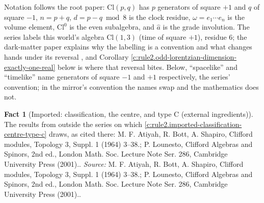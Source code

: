 \documentclass[11pt]{article}
\theoremstyle{definition}
\newtheorem{fact}[theorem]{Fact}
\theoremstyle{plain}
\providecommand{\Cl}{}\renewcommand{\Cl}{\mathrm{Cl}}
\begin{document}
Notation follows the root paper: $\Cl(p,q)$ has $p$ generators of square $+1$ and $q$ of square $-1$, $n = p + q$, $d = p - q \bmod 8$ is the clock residue, $\omega = e_1 \cdots e_n$ is the volume element, $\Cl^0$ is the even subalgebra, and $\hat{a}$ is the grade involution. The series labels this world's algebra $\Cl(1,3)$ (time of square $+1$), residue $6$; the dark-matter paper explains why the labelling is a convention and what changes hands under its reversal \cite{ButlerT14}, and Corollary \ref{c:rule2.odd-lorentzian-dimension-exactly-one-real} below is where that reversal bites. Below, ``spacelike'' and ``timelike'' name generators of square $-1$ and $+1$ respectively, the series' convention; in the mirror's convention the names swap and the mathematics does not.

\begin{fact}[Imported: classification, the centre, and type C (external ingredients)]\label{c:rule2.imported-classification-centre-type-c-external}
The results from outside the series on which \ref{c:rule2.imported-classification-centre-type-c} draws, as cited there: M. F. Atiyah, R. Bott, A. Shapiro, Clifford modules, Topology 3, Suppl. 1 (1964) 3--38.; P. Lounesto, Clifford Algebras and Spinors, 2nd ed., London Math. Soc. Lecture Note Ser. 286, Cambridge University Press (2001)..
\emph{Source:} M. F. Atiyah, R. Bott, A. Shapiro, Clifford modules, Topology 3, Suppl. 1 (1964) 3--38.; P. Lounesto, Clifford Algebras and Spinors, 2nd ed., London Math. Soc. Lecture Note Ser. 286, Cambridge University Press (2001)..
\end{fact}
\end{document}
